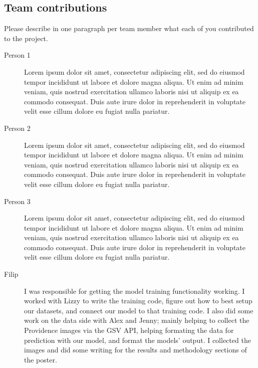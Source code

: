 \subsection*{Team contributions}

Please describe in one paragraph per team member what each of you contributed to the project.
\begin{description}
\item[Person 1] Lorem ipsum dolor sit amet, consectetur adipiscing elit, sed do eiusmod tempor incididunt ut labore et dolore magna aliqua. Ut enim ad minim veniam, quis nostrud exercitation ullamco laboris nisi ut aliquip ex ea commodo consequat. Duis aute irure dolor in reprehenderit in voluptate velit esse cillum dolore eu fugiat nulla pariatur. 
\item[Person 2] Lorem ipsum dolor sit amet, consectetur adipiscing elit, sed do eiusmod tempor incididunt ut labore et dolore magna aliqua. Ut enim ad minim veniam, quis nostrud exercitation ullamco laboris nisi ut aliquip ex ea commodo consequat. Duis aute irure dolor in reprehenderit in voluptate velit esse cillum dolore eu fugiat nulla pariatur.
\item [Person 3] Lorem ipsum dolor sit amet, consectetur adipiscing elit, sed do eiusmod tempor incididunt ut labore et dolore magna aliqua. Ut enim ad minim veniam, quis nostrud exercitation ullamco laboris nisi ut aliquip ex ea commodo consequat. Duis aute irure dolor in reprehenderit in voluptate velit esse cillum dolore eu fugiat nulla pariatur. 
\item [Filip] I was responsible for getting the model training functionality working. I worked with Lizzy to write the training code, figure out how to best setup our datasets, and connect our model to that training code. I also did some work on the data side with Alex and Jenny; mainly helping to collect the Providence images via the GSV API, helping formating the data for prediction with our model, and format the models' output. I collected the images and did some writing for the results and methodology sections of the poster. 
\end{description}


